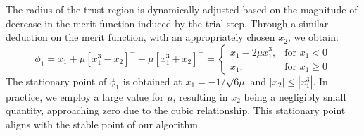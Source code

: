 The radius of the trust region is dynamically adjusted based on the magnitude of decrease in the merit function induced by the trial step. Through a similar deduction on the merit function, with an appropriately chosen $x_2$, we obtain:
\begin{equation}
    \phi_1 = x_1 + \mu[x_1^3-x_2]^-+\mu[x_1^3+x_2]^- = 
    \begin{cases}
        x_1 - 2\mu x_1^3,  & \text{for } x_1 < 0 \\
        x_1, & \text{for } x_1 \geq 0
    \end{cases}
\end{equation}
The stationary point of $\phi_1$ is obtained at $x_1 = -1/\sqrt{6\mu}$ and $|x_2|\leq|x_1^3|$. In practice, we employ a large value for $\mu$, resulting in $x_2$ being a negligibly small quantity, approaching zero due to the cubic relationship. This stationary point aligns with the stable point of our algorithm.